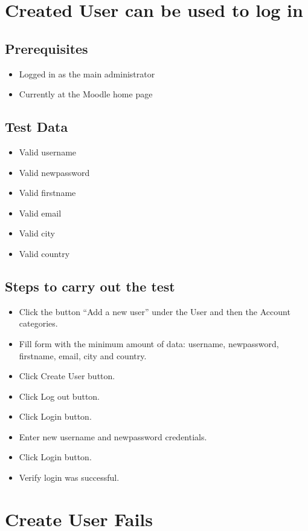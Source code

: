 \documentclass{article}
\begin{document}
\section{Created User can be used to log in}

\subsection*{Prerequisites}

\begin{itemize}
  \item Logged in as the main administrator
  \item Currently at the Moodle home page
\end{itemize}

\subsection*{Test Data}

\begin{itemize}
  \item Valid username
  \item Valid newpassword
  \item Valid firstname
  \item Valid email
  \item Valid city
  \item Valid country
\end{itemize}

\subsection*{Steps to carry out the test}

\begin{itemize}
  \item Click the button ``Add a new user'' under the User and then
    the Account categories.
  \item Fill form with the minimum amount of data: username, newpassword,
    firstname, email, city and country.
  \item Click Create User button.
  \item Click Log out button.
  \item Click Login button.
  \item Enter new username and newpassword credentials.
  \item Click Login button.
  \item Verify login was successful.
\end{itemize}

\section{Create User Fails}
\end{document}
